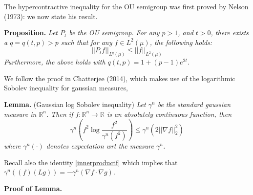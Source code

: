 \documentclass[11pt]{article}
\begin{document}
The hypercontractive inequality for the OU semigroup was first proved
by Nelson (1973): we now state his result.


\noindent\textbf{Proposition.}
\emph{Let $P_t$ be the OU semigroup. For any $p > 1$, and $t > 0$, there exists a
  $q = q(t,p) > p$ such that for any $f \in L^2(\mu)$, the following
  holds:}
\[
||P_t f||_{L^q(\mu)} \leq ||f||_{L^2(\mu)}
\]
\emph{Furthermore, the above holds with $q(t,p) = 1+(p-1)e^{2t}$.}

We follow the proof in Chatterjee (2014), which makes use of the
logarithmic Sobolev inequality for gaussian measures,

\noindent\textbf{Lemma.} (Gaussian log Sobolev inequality)
\emph{Let $\gamma^n$ be the standard gaussian measure in
  $\mathbb{R}^n$.
Then if $f: \mathbb{R}^n \to \mathbb{R}$ is an absolutely continuous
function, then}
\[
\gamma^n\left(f^2 \log \frac{f^2}{\gamma^n (f^2)}\right) \leq \gamma^n(2||\nabla f||_2^2)
\]
\emph{where $\gamma^n(\cdot)$ denotes expectation wrt the measure $\gamma^n$.}

Recall also the identity \eqref{innerproductf} which implies that
$\gamma^n((f)(Lg)) = -\gamma^n(\nabla f\cdot \nabla g)$.

\noindent\textbf{Proof of Lemma.}
\end{document}
